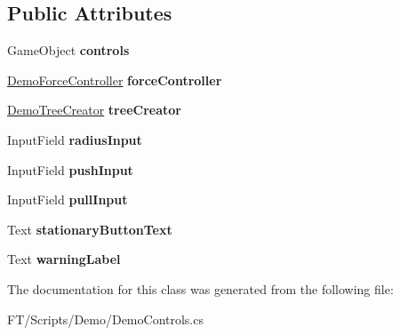 \subsection*{Public Attributes}
\begin{DoxyCompactItemize}
\item 
\mbox{\label{class_fractal_tree_1_1_demo_1_1_demo_controls_ad8346155d93e759338a769ced6e17fda}} 
Game\+Object {\bfseries controls}
\item 
\mbox{\label{class_fractal_tree_1_1_demo_1_1_demo_controls_ab8bb391b544276436e84a06c4af69295}} 
\hyperlink{class_fractal_tree_1_1_demo_1_1_demo_force_controller}{Demo\+Force\+Controller} {\bfseries force\+Controller}
\item 
\mbox{\label{class_fractal_tree_1_1_demo_1_1_demo_controls_a8ebe734c3cfcbe467e22173777825f6b}} 
\hyperlink{class_fractal_tree_1_1_demo_1_1_demo_tree_creator}{Demo\+Tree\+Creator} {\bfseries tree\+Creator}
\item 
\mbox{\label{class_fractal_tree_1_1_demo_1_1_demo_controls_a368597dd8008c3cc8cc7a5c336b44faa}} 
Input\+Field {\bfseries radius\+Input}
\item 
\mbox{\label{class_fractal_tree_1_1_demo_1_1_demo_controls_af9fa15fa4782f33b17a87eb230ec7dc1}} 
Input\+Field {\bfseries push\+Input}
\item 
\mbox{\label{class_fractal_tree_1_1_demo_1_1_demo_controls_ae1abb5ada8caf9f44f7945f9bfad91d5}} 
Input\+Field {\bfseries pull\+Input}
\item 
\mbox{\label{class_fractal_tree_1_1_demo_1_1_demo_controls_ad2fdbc4da61fcb459f58a11eaf51157c}} 
Text {\bfseries stationary\+Button\+Text}
\item 
\mbox{\label{class_fractal_tree_1_1_demo_1_1_demo_controls_a69bea268d002e8fc8c3dc23770bbbbe6}} 
Text {\bfseries warning\+Label}
\end{DoxyCompactItemize}


The documentation for this class was generated from the following file\+:\begin{DoxyCompactItemize}
\item 
F\+T/\+Scripts/\+Demo/Demo\+Controls.\+cs\end{DoxyCompactItemize}
